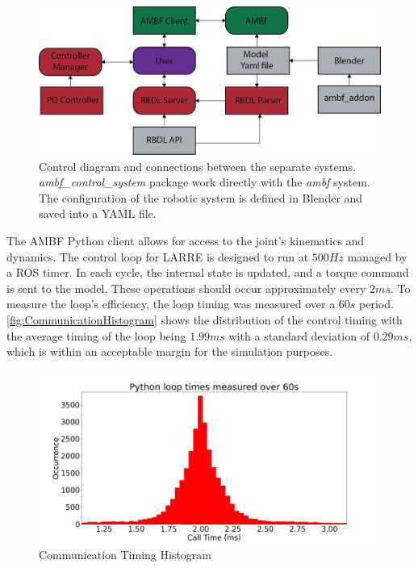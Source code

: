   \begin{figure}[h]
    \centering
    \includegraphics{images/sim/AMBF_control_diagram (1).png}
    \caption[AMBF Control Diagram]{Control diagram and connections between the separate systems. \textit{ambf\_control\_system} package work directly with the \textit{ambf} system. The configuration of the robotic system is defined in Blender and saved into a YAML file.}
    \label{fig:SystemDiagram}
\end{figure}

 
 The AMBF Python client allows for access to the joint's kinematics and dynamics. The control loop for LARRE is designed to run at $500Hz$ managed by a ROS timer. In each cycle, the internal state is updated, and a torque command is sent to the model. These operations should occur approximately every $2ms$. To measure the loop's efficiency, the loop timing was measured over a $60s$ period. \autoref{fig:CommunicationHistogram} shows the distribution of the control timing with the average timing of the loop being $1.99ms$ with a standard deviation of $0.29ms$, which is within an acceptable margin for the simulation purposes. 
 
  
 \begin{figure}
     \centering
     \includegraphics[scale=0.35]{images/sim/loop_timming.png}
     \caption[Communication Timing Histogram]{Communication Timing Histogram}
     \label{fig:CommunicationHistogram}
 \end{figure}
 


